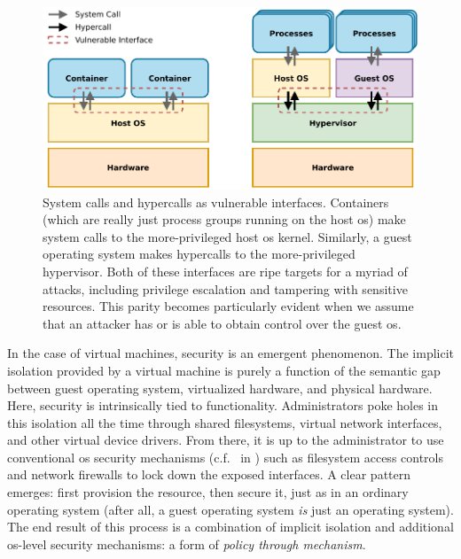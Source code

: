 \documentclass[
  fontsize=12pt,
  titlepage=firstiscover,
  paper=letter,
oneside,
  cleardoublepage=plain,
  parskip=half-,
  DIV=10,
  parindent,
  appendixprefix,
  chapterprefix,
  listof=totoc,
]{scrbook}
\begin{document}
\begin{figure}[htbp]
  \centering
  \includegraphics[width=0.8\linewidth]{figs/confinement-problem/syscall-hypercall.pdf}
  \caption[System calls and hypercalls as vulnerable interfaces]{
    System calls and hypercalls as vulnerable interfaces. Containers (which are really
    just process groups running on the host \gls{os}) make system calls to the
    more-privileged host \gls{os} kernel. Similarly, a guest operating system makes
    hypercalls to the more-privileged hypervisor. Both of these interfaces are ripe
    targets for a myriad of attacks, including privilege escalation and tampering with
    sensitive resources. This parity becomes particularly evident when we assume that an
    attacker has or is able to obtain control over the guest \gls{os}.
  }\label{fig:syscall-hypercall}
\end{figure}



In the case of virtual machines, security is an emergent phenomenon. The implicit
isolation provided by a virtual machine is purely a function of the semantic gap between
guest operating system, virtualized hardware, and physical hardware. Here, security is
intrinsically tied to functionality. Administrators poke holes in this isolation all the
time through shared filesystems, virtual network interfaces, and other virtual device
drivers. From there, it is up to the administrator to use conventional \gls{os} security
mechanisms (c.f.\  in
) such as filesystem access controls and network firewalls to lock down
the exposed interfaces.  A clear pattern emerges: first provision the resource, then secure
it, just as in an ordinary operating system (after all, a guest operating system
\textit{is} just an operating system). The end result of this process is a combination of
implicit isolation and additional \gls{os}-level security mechanisms: a form of
\textit{policy through mechanism}.
\end{document}
